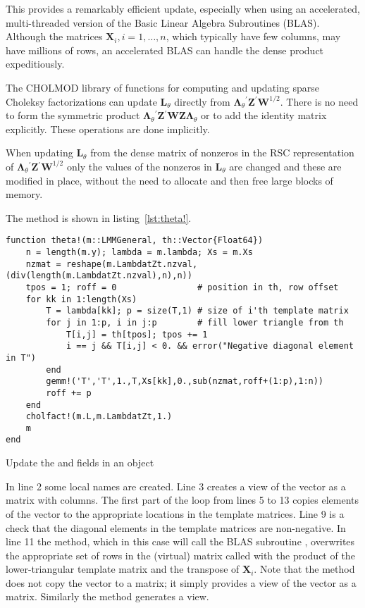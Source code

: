 \documentclass{jss}
\newcommand{\bLt}{\ensuremath{\bm\Lambda_\theta}}
\newcommand{\trans}{\ensuremath{^\prime}}
\begin{document}
This provides a remarkably efficient update, especially when using an
accelerated, multi-threaded version of the Basic Linear Algebra
Subroutines (BLAS).  Although the matrices $\bm X_i,i=1,\dots,n$,
which typically have few columns, may have millions of rows, an
accelerated BLAS can handle the dense product expeditiously.

The CHOLMOD library of  functions for computing and
updating sparse Choleksy factorizations can update $\bm L_\theta$
directly from $\bLt\trans\bm Z\trans\bm W^{1/2}$.  There is no need to
form the symmetric product $\bLt\trans\bm Z\trans\bm W\bm Z\bLt$ or to
add the identity matrix explicitly.  These operations are done
implicitly. 

When updating $\bm L_\theta$ from the dense matrix of nonzeros in the
RSC representation of $\bLt\trans\bm Z\trans\bm W^{1/2}$ only the
values of the nonzeros in $\bm L_\theta$ are changed and these are
modified in place, without the need to allocate and then free large
blocks of memory.

The  method is shown in listing~\ref{lst:theta!}.
\begin{listing}[tbp]
  \begin{verbatim}
function theta!(m::LMMGeneral, th::Vector{Float64})
    n = length(m.y); lambda = m.lambda; Xs = m.Xs
    nzmat = reshape(m.LambdatZt.nzval, (div(length(m.LambdatZt.nzval),n),n))
    tpos = 1; roff = 0                # position in th, row offset
    for kk in 1:length(Xs)
        T = lambda[kk]; p = size(T,1) # size of i'th template matrix
        for j in 1:p, i in j:p        # fill lower triangle from th
            T[i,j] = th[tpos]; tpos += 1
            i == j && T[i,j] < 0. && error("Negative diagonal element in T")
        end
        gemm!('T','T',1.,T,Xs[kk],0.,sub(nzmat,roff+(1:p),1:n))
        roff += p
    end
    cholfact!(m.L,m.LambdatZt,1.)
    m
end
  \end{verbatim}
  \caption{Update the  and  fields in an
     object}
  \label{lst:theta!}
\end{listing}
In line 2 some local names are created.  Line 3 creates a view of the
vector  as a matrix with  columns.  The
first part of the loop from lines 5 to 13 copies elements of the
 vector to the appropriate locations in the template matrices.
Line 9 is a check that the diagonal elements in the template matrices
are non-negative.  In line 11 the  method, which in this
case will call the BLAS subroutine , overwrites the
appropriate set of rows in the (virtual) matrix called 
with the product of the lower-triangular template matrix and the
transpose of $\bm X_i$.  Note that the  method does not
copy the vector to a matrix; it simply provides a view of the vector
as a matrix.  Similarly the  method generates a view.
\end{document}
